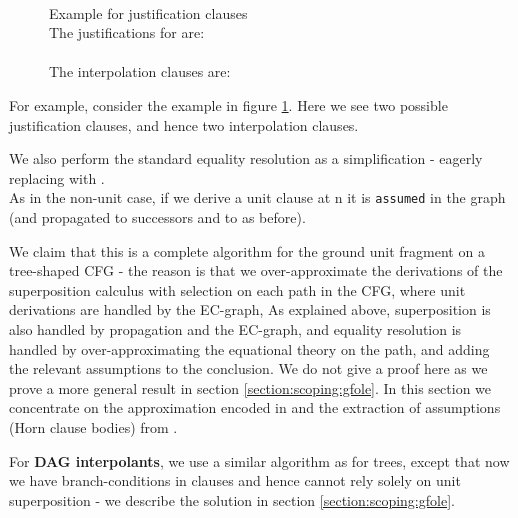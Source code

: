 \begin{figure}
\\
\caption{Example for justification clauses\\
The justifications for  are:\\
\\
The interpolation clauses are:\\
}
\label{example_4.2.2.1}
\end{figure}

\noindent
For example, consider the example in figure \ref{example_4.2.2.1}.
Here we see two possible justification clauses, and hence two interpolation clauses.

We also perform the standard equality resolution as a simplification - eagerly replacing  with 
.\\
As in the non-unit case, if we derive a unit clause at n it is \lstinline|assumed| in the graph  (and propagated to successors and to  as before).

We claim that this is a complete algorithm for the ground unit fragment on a tree-shaped CFG - 
the reason is that we over-approximate the derivations of the superposition calculus with selection on each path in the CFG,
where unit derivations are handled by the EC-graph, As explained above, superposition is also handled by propagation and the EC-graph,
and equality resolution is handled by over-approximating the equational theory on the path, and adding the relevant assumptions to the conclusion. 
We do not give a proof here as we prove a more general result in section \ref{section:scoping:gfole}.
In this section we concentrate on the approximation encoded in  and the extraction of assumptions (Horn clause bodies) from .

For \textbf{DAG interpolants}, we use a similar algorithm as for trees, 
except that now we have branch-conditions in clauses and hence cannot rely solely on unit superposition - we describe the solution in section \ref{section:scoping:gfole}.

